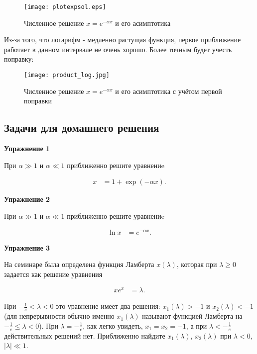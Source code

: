 \documentclass[a4paper,12pt]{article}
\begin{document}
\begin{figure}[h]
	\caption{Численное решение $x=e^{-\alpha x}$ и его асимптотика}
	\centering
	\texttt{[image: plotexpsol.eps]}
\end{figure}

Из-за того, что логарифм - медленно растущая функция, первое приближение работает в данном интервале не очень хорошо. Более точным будет учесть поправку: 
\begin{figure}[h]
	\caption{Численное решение $x=e^{-\alpha x}$ и его асимптотика с учётом первой поправки}
	\centering
	\texttt{[image: product\_log.jpg]}
\end{figure}

\newpage

\subsection*{Задачи для домашнего решения}

\noindent \textbf{Упражнение 1}

\noindent При $\alpha\gg 1$ и $\alpha\ll 1$ приближенно решите уравнениe

\noindent 
\begin{align*}
x & =1+\exp(-\alpha x).
\end{align*}

\vspace{15pt}
\noindent \textbf{Упражнение 2}

\noindent При $\alpha\gg 1$ и $\alpha\ll 1$ приближенно решите уравнениe

\noindent 
\begin{align*}
\ln x & =e^{-\alpha x}.
\end{align*}

\vspace{15pt}
\noindent \textbf{Упражнение 3}

\noindent На семинаре была определена функция Ламберта $x(\lambda)$, которая при $\lambda\geq 0$ задается как решение уравнения

\noindent 
\begin{align*}
xe^{x} & =\lambda.
\end{align*}

\noindent При $-\frac{1}{e}<\lambda<$0 это уравнение имеет два решения: $x_{1}(\lambda)>-1$ и $x_{2}(\lambda)<-1$ (для непрерывности обычно именно $x_{1}(\lambda)$ называют функцией Ламберта на $-\frac{1}{e}\leq\lambda<0$). При $\lambda=-\frac{1}{e}$, как легко увидеть, $ x_{1}=x_{2}=-1$, а при $\lambda<-\frac{1}{e}$ действительных решений нет. Приближенно найдите $x_{1}(\lambda)$, $x_{2}(\lambda)$ при $\lambda<0$, $|\lambda|\ll 1$. 
\end{document}
